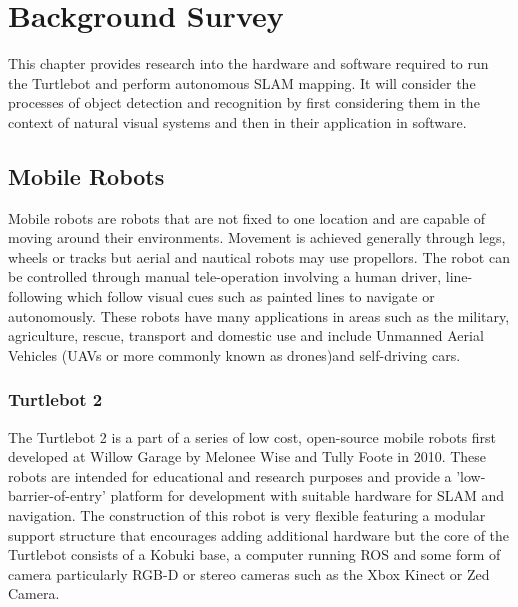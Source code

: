 \documentclass{mproj}
\begin{document}
\chapter{Background Survey}\label{survey}

This chapter provides research into the hardware and software required to run the Turtlebot and perform autonomous SLAM mapping.
It will consider the processes of object detection and recognition by first considering them in the context of natural visual systems and then in their application in software.

\section{Mobile Robots}


Mobile robots are robots that are not fixed to one location and are capable of moving around their environments. Movement is achieved generally through legs, wheels or tracks but aerial and nautical robots may use propellors. The robot can be controlled through manual tele-operation involving a human driver, line-following which follow visual cues such as painted lines to navigate or autonomously. These robots have many applications in areas such as the military, agriculture, rescue, transport and domestic use and include Unmanned Aerial Vehicles (UAVs or more commonly known as drones)and self-driving cars.

\subsection{Turtlebot 2}

The Turtlebot 2 is a part of a series of low cost, open-source mobile robots first developed at Willow Garage by Melonee Wise and Tully Foote in 2010. These robots are intended for educational and research purposes and provide a 'low-barrier-of-entry' platform for development with suitable hardware for SLAM and navigation\cite{turtlebot}. The construction of this robot is very flexible featuring a modular support structure that encourages adding additional hardware but the core of the Turtlebot consists of a Kobuki base, a computer running ROS and some form of camera particularly RGB-D or stereo cameras such as the Xbox Kinect or Zed Camera.
\end{document}
